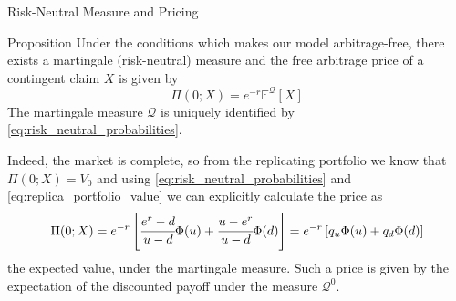 \documentclass{beamer}
\begin{document}
\begin{frame}{Risk-Neutral Measure and Pricing}
	\begin{block}{Proposition}
	Under the conditions which makes our model arbitrage-free, there exists a martingale (risk-neutral) measure and the free arbitrage price of a contingent claim $X$ is given by 
	\begin{equation*}
		\Pi(0; X) = e^{-r}\mathbb{E}^{\mathcal{Q}}[X]
	\end{equation*} 
	The martingale measure $\mathcal{Q}$ is uniquely identified by \cref{eq:risk_neutral_probabilities}.
	\end{block}
	
	Indeed, the market is complete, so from the replicating portfolio we know that $\Pi(0;X) = V_0$ and using 	\cref{eq:risk_neutral_probabilities} and \cref{eq:replica_portfolio_value} we can explicitly calculate the price as
	\begin{equation*}
	\Pi(0;X) = e^{-r}\left[\cfrac{e^r-d}{u-d}\Phi(u)+\cfrac{u-e^r}{u-d}\Phi(d)\right] = e^{-r}\left[q_u\Phi(u)+q_d\Phi(d)\right]
	\end{equation*}
	the expected value, under the martingale measure.
	Such a price is given by the expectation of the discounted payoff under the measure $\mathcal{Q}^0$.
	
	
	
\end{frame}
\end{document}
